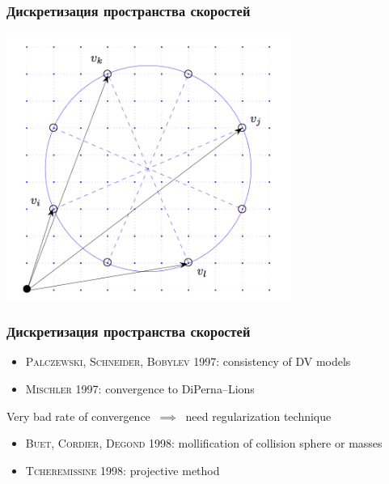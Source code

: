 \documentclass[mathserif]{beamer} %
\newcommand{\Cite}[2][]{\alert{\textsc{#2 #1}}}
\begin{document}
\begin{frame}
    \frametitle{Дискретизация пространства скоростей}
    \begin{center}
    \includegraphics[width=0.7\textwidth]{cutted/dimarco}
    \end{center}
\end{frame}

\begin{frame}
    \frametitle{Дискретизация пространства скоростей}
    \begin{itemize}
        \item \Cite[1997]{Palczewski, Schneider, Bobylev}: consistency of DV models
        \item \Cite[1997]{Mischler}: convergence to DiPerna--Lions
    \end{itemize}
    Very bad rate of convergence \(\:\implies\:\) need regularization technique
    \begin{itemize}
        \item \Cite[1998]{Buet, Cordier, Degond}: mollification of collision sphere or masses
        \item \Cite[1998]{Tcheremissine}: projective method
    \end{itemize}
\end{frame}
\end{document}
